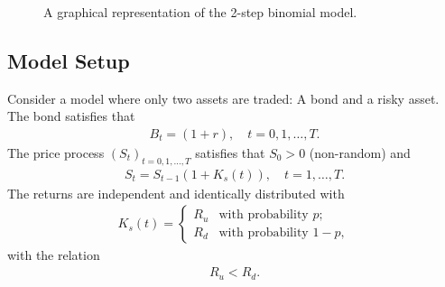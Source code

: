 \documentclass{article}
\theoremstyle{definition}
\numberwithin{equation}{section}
\begin{document}
\begin{figure}
    \centering
    \caption{A graphical representation of the 2-step binomial model.}
    \label{fig:2_step_binomial_model}
\end{figure}

\subsection{Model Setup}
Consider a model where only two assets are traded: A bond and a risky asset.
The bond satisfies that
\begin{align}
    B_t = (1+r), \quad t = 0,1, \ldots, T.
\end{align}
The price process $(S_t)_{t = 0,1, \ldots, T}$ satisfies that $S_0 > 0$ (non-random) and
\begin{align}
    S_t = S_{t - 1} (1 + K_s(t)), \quad t = 1, \ldots, T.
\end{align}
The returns are independent and identically distributed with
\begin{align}
    K_s(t) =
    \begin{cases}
        R_u &\text{with probability } p; \\
        R_d &\text{with probability } 1-p,
    \end{cases}
\end{align}
with the relation
\begin{align}
    R_u < R_d.
\end{align}
\end{document}
